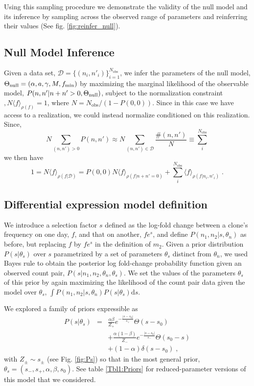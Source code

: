 \documentclass[letterpaper,english,prl,reprint,longbibliography]{revtex4-1} %
\begin{document}
Using this sampling procedure we demonstrate the validity of the null model and its inference by sampling across the observed range of parameters and reinferring their values (See fig. \ref{fig:reinfer_null}).

\subsection*{Null Model Inference}
Given a data set, $\mathcal{D}=\{(n_i,n'_i)\}_{i=1}^{N_{\textrm{obs}}}$, we infer the parameters of the null model, $\Theta_{\textrm{\textrm{null}}}=(\alpha,a,\gamma,M,f_{\textrm{min}})$ by maximizing the marginal likelihood of the observable model, $P(n,n'|n+n'>0,\Theta_{\textrm{\textrm{null}}})$, subject to the normalization constraint$, N\langle f\rangle_{\rho(f)}=1$, where $N=N_{\textrm{obs}}/(1-P(0,0))$. Since in this case we have access to a realization, we could instead normalize conditioned on this realization. Since, 
\begin{equation*}
	N\sum_{(n,n')>0}P(n,n')\approx N\sum_{(n,n')\in \mathcal{D}}\frac{\#(n,n')}{N}\equiv \sum_{i}^{N_{\textrm{obs}}}
\end{equation*}
we then have
\begin{equation}
	1=N\langle f\rangle_{\rho(f|\mathcal{D})}
							   = P(0,0)N\langle f\rangle_{\rho(f|n+n'=0)} + \sum_{i}^{N_{\textrm{obs}}}\langle f\rangle_{\rho(f|n_i,n'_i)}\;.
\end{equation}

\subsection*{Differential expression model definition}
We introduce a selection factor $s$ defined as the log-fold change between a clone's frequency on one day, $f$, and that on another, $fe^s$, and define $P(n_1,n_2|s,\theta_n)$ as before, but replacing $f$ by $fe^s$ in the definition of $m_2$. Given a prior distribution  $P(s|\theta_s)$ over $s$ parametrized by a set of parameters $\theta_s$ distinct from $\theta_n$, we used Bayes rule to obtain the posterior log fold-change probability function given an observed count pair, $P(s|n_1,n_2,\theta_n,\theta_s)$. We set the values of the parameters $\theta_s$ of this prior by again maximizing the likelihood of the count pair data given the model over $\theta_s$, $\int P(n_1,n_2|s,\theta_n)P(s|\theta_s)\textrm{d}s$.

We explored a family of priors expressible as 
\begin{eqnarray}
	P(s|\theta_s)&=&\frac{\alpha \beta}{Z_+}e^{-\frac{|s-s_0|}{s_+}}\Theta(s-s_0) \nonumber\\
	&&+\frac{\alpha (1-\beta)}{Z_-}e^{-\frac{|s-s_0|}{s_-}}\Theta(s_0-s) \\
	&&+(1-\alpha)\delta(s-s_0)\;, \label{eq:genPs}\nonumber
\end{eqnarray}
with $Z_{\pm} \sim s_{\pm}$ (see Fig. \ref{fig:Ps}) so that in the most general prior, $\theta_s=(s_-,s_+,\alpha,\beta,s_0)$. See table \ref{Tbl1:Priors} for reduced-parameter versions of this model that we considered.
\end{document}
